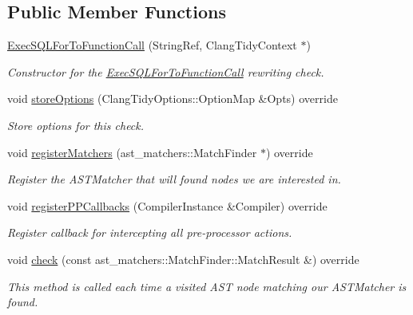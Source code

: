 \subsection*{Public Member Functions}
\begin{DoxyCompactItemize}
\item 
\hyperlink{classclang_1_1tidy_1_1pagesjaunes_1_1_exec_s_q_l_for_to_function_call_a926ca8825605877d043f9bbaf3e0e5d8}{Exec\+S\+Q\+L\+For\+To\+Function\+Call} (String\+Ref, Clang\+Tidy\+Context $\ast$)
\begin{DoxyCompactList}\small\item\em Constructor for the \hyperlink{classclang_1_1tidy_1_1pagesjaunes_1_1_exec_s_q_l_for_to_function_call}{Exec\+S\+Q\+L\+For\+To\+Function\+Call} rewriting check. \end{DoxyCompactList}\item 
void \hyperlink{classclang_1_1tidy_1_1pagesjaunes_1_1_exec_s_q_l_for_to_function_call_ad7d6a6ef1fcbcfcc4f3dcc875815e27d}{store\+Options} (Clang\+Tidy\+Options\+::\+Option\+Map \&Opts) override
\begin{DoxyCompactList}\small\item\em Store options for this check. \end{DoxyCompactList}\item 
void \hyperlink{classclang_1_1tidy_1_1pagesjaunes_1_1_exec_s_q_l_for_to_function_call_ab18c38a24c7fbe5ce1f50804414ce079}{register\+Matchers} (ast\+\_\+matchers\+::\+Match\+Finder $\ast$) override
\begin{DoxyCompactList}\small\item\em Register the A\+S\+T\+Matcher that will found nodes we are interested in. \end{DoxyCompactList}\item 
void \hyperlink{classclang_1_1tidy_1_1pagesjaunes_1_1_exec_s_q_l_for_to_function_call_a85b2ab87d5ebd74633e974efee0dafc6}{register\+P\+P\+Callbacks} (Compiler\+Instance \&Compiler) override
\begin{DoxyCompactList}\small\item\em Register callback for intercepting all pre-\/processor actions. \end{DoxyCompactList}\item 
void \hyperlink{classclang_1_1tidy_1_1pagesjaunes_1_1_exec_s_q_l_for_to_function_call_abafbec75f2ed77ade5617ad6fa2c2a0d}{check} (const ast\+\_\+matchers\+::\+Match\+Finder\+::\+Match\+Result \&) override
\begin{DoxyCompactList}\small\item\em This method is called each time a visited A\+ST node matching our A\+S\+T\+Matcher is found. \end{DoxyCompactList}\end{DoxyCompactItemize}

